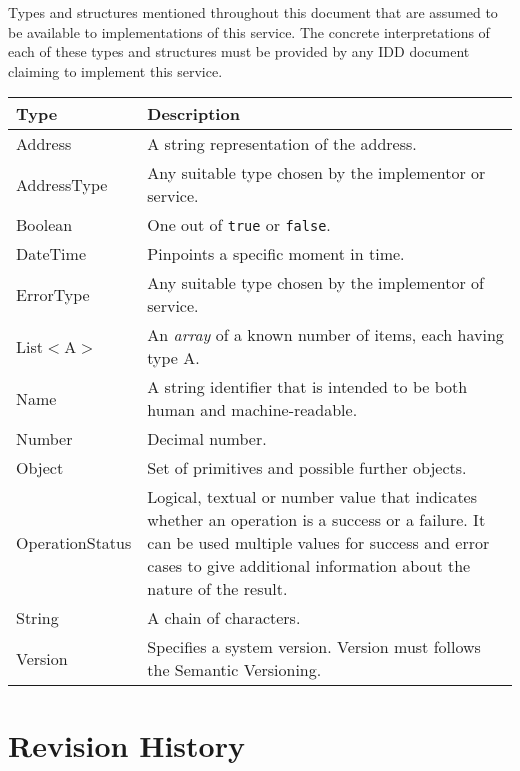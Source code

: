 \documentclass[a4paper]{arrowhead}
\newcommand{\pdef}[1]{{\textcolor{ArrowheadGrey}{#1\label{sec:model:primitives:#1}\label{sec:model:primitives:#1s}\label{sec:model:primitives:#1es}}}}
\begin{document}
Types and structures mentioned throughout this document that are assumed to be available to implementations of this service.
The concrete interpretations of each of these types and structures must be provided by any IDD document claiming to implement this service.


\begin{table}[ht!]
\begin{tabularx}{\textwidth}{| p{3cm} | X |} \hline
\rowcolor{gray!33} Type & Description \\ \hline
\pdef{Address}          & A string representation of the address. \\ \hline
\pdef{AddressType}      & Any suitable type chosen by the implementor or service. \\ \hline
\pdef{Boolean}          & One out of \texttt{true} or \texttt{false}. \\ \hline
\pdef{DateTime}         & Pinpoints a specific moment in time. \\ \hline
\pdef{ErrorType}        & Any suitable type chosen by the implementor of service. \\ \hline
\pdef{List}$<$A$>$      & An \textit{array} of a known number of items, each having type A. \\ \hline
\pdef{Name}             & A string identifier that is intended to be both human and machine-readable. \\ \hline
\pdef{Number}           & Decimal number. \\ \hline
\pdef{Object}           & Set of primitives and possible further objects. \\ \hline
\pdef{OperationStatus}  & Logical, textual or number value that indicates whether an operation is a success or a failure. It can be used multiple values for success and error cases to give additional information about the nature of the result. \\ \hline
\pdef{String}           & A chain of characters. \\ \hline
\pdef{Version}          & Specifies a system version. Version must follows the Semantic Versioning. \\ \hline
\end{tabularx}
\end{table}

\newpage




\newpage

\section{Revision History}
\end{document}
